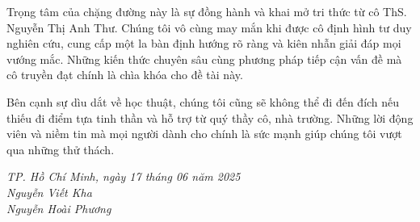 Trọng tâm của chặng đường này là sự đồng hành và khai mở tri thức từ cô ThS. Nguyễn Thị Anh Thư. Chúng tôi vô cùng may mắn khi được cô định hình tư duy nghiên cứu, cung cấp một la bàn định hướng rõ ràng và kiên nhẫn giải đáp mọi vướng mắc. Những kiến thức chuyên sâu cùng phương pháp tiếp cận vấn đề mà cô truyền đạt chính là chìa khóa cho đề tài này.

Bên cạnh sự dìu dắt về học thuật, chúng tôi cũng sẽ không thể đi đến đích nếu thiếu đi điểm tựa tinh thần và hỗ trợ từ quý thầy cô, nhà trường. Những lời động viên và niềm tin mà mọi người dành cho chính là sức mạnh giúp chúng tôi vượt qua những thử thách.





\begin{flushright}
\textit {TP. Hồ Chí Minh, ngày 17 tháng 06 năm 2025} \\
\textit {Nguyễn Viết Kha \\
            Nguyễn Hoài Phương}
\end{flushright}

